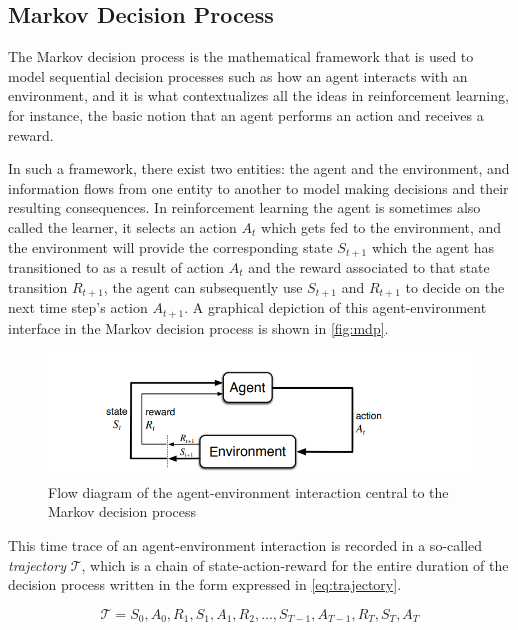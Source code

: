 \documentclass[../report.tex]{subfiles}
\begin{document}
\subsection{Markov Decision Process}

The Markov decision process is the mathematical framework that is used to model sequential decision processes such as how an agent interacts with an environment, and it is what contextualizes all the ideas in reinforcement learning, for instance, the basic notion that an agent performs an action and receives a reward.

In such a framework, there exist two entities: the agent and the environment, and information flows from one entity to another to model making decisions and their resulting consequences. In reinforcement learning the agent is sometimes also called the learner, it selects an action $A_t$ which gets fed to the environment, and the environment will provide the corresponding state $S_{t+1}$ which the agent has transitioned to as a result of action $A_t$ and the reward associated to that state transition $R_{t+1}$, the agent can subsequently use $S_{t+1}$ and $R_{t+1}$ to decide on the next time step's action $A_{t+1}$. A graphical depiction of this agent-environment interface in the Markov decision process is shown in \autoref{fig:mdp}.

\begin{figure}[H]
    \centering
    \includegraphics[width=\textwidth]{figures/01/mdp.png}
    \caption{Flow diagram of the agent-environment interaction central to the Markov decision process}
    \label{fig:mdp}
\end{figure}

This time trace of an agent-environment interaction is recorded in a so-called \textit{trajectory} $\mathcal{T}$, which is a chain of state-action-reward for the entire duration of the decision process written in the form expressed in \autoref{eq:trajectory}.

\begin{equation} \label{eq:trajectory}
    \mathcal{T} = S_{0}, A_{0}, R_{1}, S_{1}, A_{1}, R_{2}, \dots, S_{T-1}, A_{T-1}, R_{T}, S_{T}, A_{T}
\end{equation}
\end{document}

